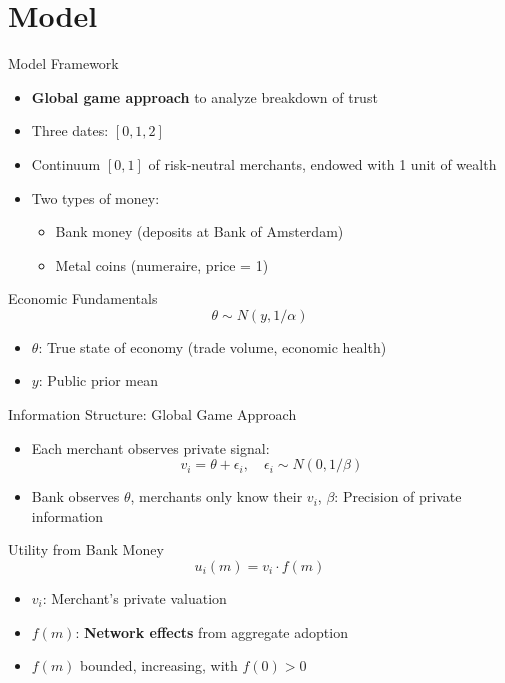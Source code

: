 \documentclass[aspectratio=169, xcolor=table]{beamer}
\begin{document}

\section{Model}
\begin{frame}{Model Framework}
  \begin{itemize}
    \item \textbf{Global game approach} to analyze breakdown of trust
    \item Three dates: $[0, 1, 2]$
    \item Continuum $[0,1]$ of risk-neutral merchants, endowed with 1 unit of wealth
    \item Two types of money:
          \begin{itemize}
            \item Bank money (deposits at Bank of Amsterdam)
            \item Metal coins (numeraire, price = 1)
          \end{itemize}
  \end{itemize}
  \begin{block}{Economic Fundamentals}
    $$\theta \sim N(y, 1/\alpha)$$
    \begin{itemize}
      \item $\theta$: True state of economy (trade volume, economic health)
      \item $y$: Public prior mean
    \end{itemize}
  \end{block}
\end{frame}

\begin{frame}{Information Structure: Global Game Approach}
  \begin{itemize}
    \item Each merchant observes private signal:
          \[
            v_i = \theta + \epsilon_i, \quad \epsilon_i \sim N(0, 1/\beta)
          \]
    \item Bank observes $\theta$, merchants only know their $v_i$, $\beta$: Precision of private information
  \end{itemize}
  \begin{block}{Utility from Bank Money}
    \[
      u_i(m) = v_i \cdot f(m)
    \]
    \begin{itemize}
      \item $v_i$: Merchant's private valuation
      \item $f(m)$: \textbf{Network effects} from aggregate adoption
      \item $f(m)$ bounded, increasing, with $f(0) > 0$
    \end{itemize}
  \end{block}
\end{frame}
\end{document}
